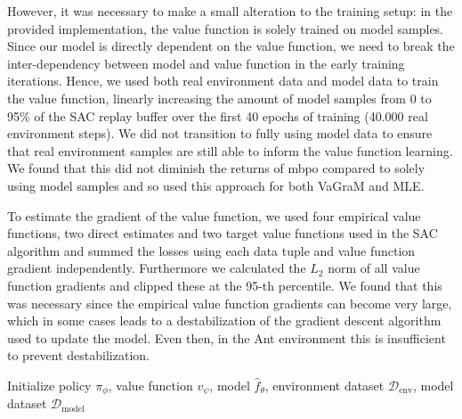 However, it was necessary to make a small alteration to the training setup: in the provided implementation, the value function is solely trained on model samples.
Since our model is directly dependent on the value function, we need to break the inter-dependency between model and value function in the early training iterations.
Hence, we used both real environment data and model data to train the value function, linearly increasing the amount of model samples from 0 to 95\% of the SAC replay buffer over the first 40 epochs of training (40.000 real environment steps).
We did not transition to fully using model data to ensure that real environment samples are still able to inform the value function learning.
We found that this did not diminish the returns of \ac{mbpo} compared to solely using model samples and so used this approach for both VaGraM and MLE.

To estimate the gradient of the value function, we used four empirical value functions, two direct estimates and two target value functions used in the SAC algorithm and summed the losses using each data tuple and value function gradient independently.
Furthermore we calculated the $L_2$ norm of all value function gradients and clipped these at the 95-th percentile.
We found that this was necessary since the empirical value function gradients can become very large, which in some cases leads to a destabilization of the gradient descent algorithm used to update the model.
Even then, in the Ant environment this is insufficient to prevent destabilization.


\begin{algorithm}[t]
\caption{Value-Gradient weighted Model learning (VaGraM)}\label{alg:vambpo}
Initialize policy $\pi_\phi$, value function $v_\psi$, model $\hat{f}_\theta$, environment dataset $\mathcal{D}_\text{env}$, model dataset $\mathcal{D}_\text{model}$\;
{
}
\end{algorithm}

